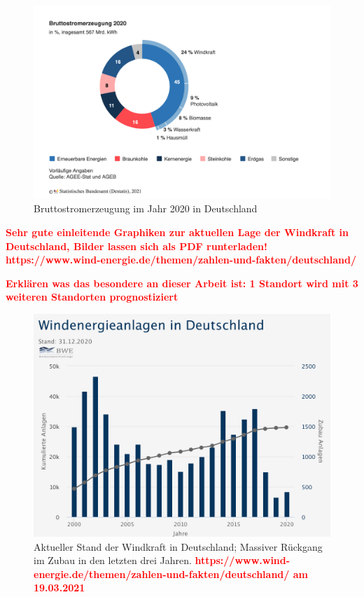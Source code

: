 \documentclass[
12pt, %
toc=listofnumbered, %
toc=chapterentrydotfill, %
numbers=noenddot, %
captions=tableheading, %
bibliography=numbered
]{scrreprt}
\newcommand{\highlight}[1]{\textbf{\textcolor{red}{#1}}}
\begin{document}
\begin{figure}[tph]
	\begin{center}
		\includegraphics[width=.8\textwidth]{./images/bruttostromerzeugung-erneuerbare-energien.png}
		\caption{Bruttostromerzeugung im Jahr 2020 in Deutschland}
		\label{fig:strommix_deutschland}
	\end{center}
\end{figure}

\highlight{Sehr gute einleitende Graphiken zur aktuellen Lage der Windkraft in Deutschland, Bilder lassen sich als PDF runterladen!\\
https://www.wind-energie.de/themen/zahlen-und-fakten/deutschland/}

\highlight{Erklären was das besondere an dieser Arbeit ist: 1 Standort wird mit 3 weiteren Standorten prognostiziert}


\begin{figure}[tph]
	\begin{center}
		\includegraphics[width=.8\textwidth]{./images/windanlagen_deutschland.pdf}
		\caption{Aktueller Stand der Windkraft in Deutschland; Massiver Rückgang im Zubau in den letzten drei Jahren. \highlight{https://www.wind-energie.de/themen/zahlen-und-fakten/deutschland/ am 19.03.2021}}
		\label{fig:windkraft_deutschland}
	\end{center}
\end{figure}
\end{document}
